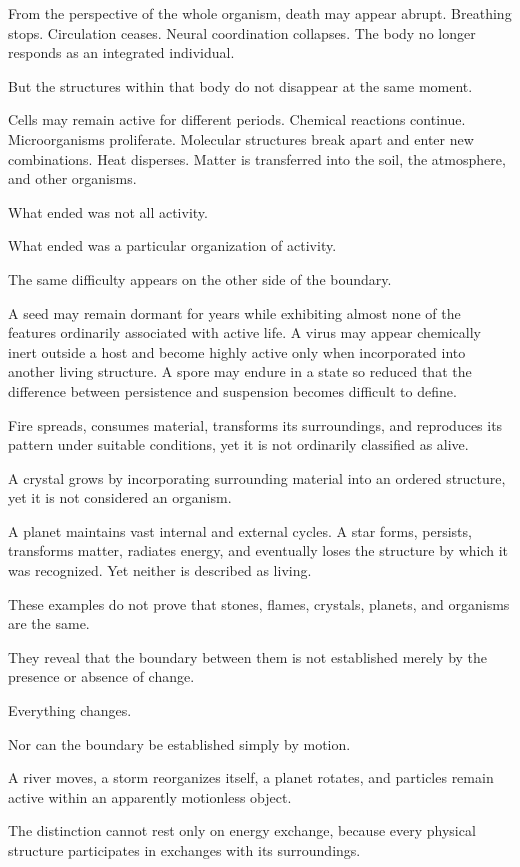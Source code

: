 From the perspective of the whole organism, death may appear abrupt. Breathing stops. Circulation ceases. Neural coordination collapses. The body no longer responds as an integrated individual.

But the structures within that body do not disappear at the same moment.

Cells may remain active for different periods. Chemical reactions continue. Microorganisms proliferate. Molecular structures break apart and enter new combinations. Heat disperses. Matter is transferred into the soil, the atmosphere, and other organisms.

What ended was not all activity.

What ended was a particular organization of activity.

The same difficulty appears on the other side of the boundary.

A seed may remain dormant for years while exhibiting almost none of the features ordinarily associated with active life. A virus may appear chemically inert outside a host and become highly active only when incorporated into another living structure. A spore may endure in a state so reduced that the difference between persistence and suspension becomes difficult to define.

Fire spreads, consumes material, transforms its surroundings, and reproduces its pattern under suitable conditions, yet it is not ordinarily classified as alive.

A crystal grows by incorporating surrounding material into an ordered structure, yet it is not considered an organism.

A planet maintains vast internal and external cycles. A star forms, persists, transforms matter, radiates energy, and eventually loses the structure by which it was recognized. Yet neither is described as living.

These examples do not prove that stones, flames, crystals, planets, and organisms are the same.

They reveal that the boundary between them is not established merely by the presence or absence of change.

Everything changes.

Nor can the boundary be established simply by motion.

A river moves, a storm reorganizes itself, a planet rotates, and particles remain active within an apparently motionless object.

The distinction cannot rest only on energy exchange, because every physical structure participates in exchanges with its surroundings.

